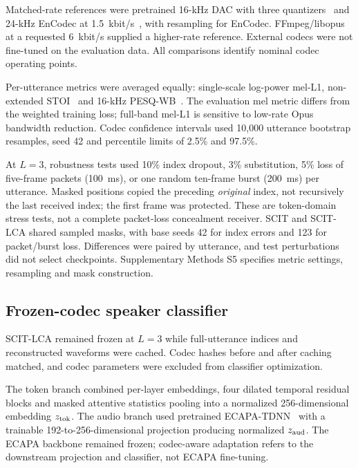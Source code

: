 \documentclass[final,5p,times,twocolumn]{elsarticle}
\begin{document}
Matched-rate references were pretrained 16-kHz DAC with three quantizers~\cite{dac} and 24-kHz EnCodec at 1.5~kbit/s~\cite{encodec}, with resampling for EnCodec. FFmpeg/libopus at a requested 6~kbit/s supplied a higher-rate reference. External codecs were not fine-tuned on the evaluation data. All comparisons identify nominal codec operating points.

Per-utterance metrics were averaged equally: single-scale log-power mel-L1, non-extended STOI~\cite{stoi} and 16-kHz PESQ-WB~\cite{pesq}. The evaluation mel metric differs from the weighted training loss; full-band mel-L1 is sensitive to low-rate Opus bandwidth reduction. Codec confidence intervals used 10,000 utterance bootstrap resamples, seed 42 and percentile limits of 2.5\% and 97.5\%.

At $L=3$, robustness tests used 10\% index dropout, 3\% substitution, 5\% loss of five-frame packets (100~ms), or one random ten-frame burst (200~ms) per utterance. Masked positions copied the preceding \emph{original} index, not recursively the last received index; the first frame was protected. These are token-domain stress tests, not a complete packet-loss concealment receiver. SCIT and SCIT-LCA shared sampled masks, with base seeds 42 for index errors and 123 for packet/burst loss. Differences were paired by utterance, and test perturbations did not select checkpoints. Supplementary Methods S5 specifies metric settings, resampling and mask construction.

\subsection{Frozen-codec speaker classifier}
SCIT-LCA remained frozen at $L=3$ while full-utterance indices and reconstructed waveforms were cached. Codec hashes before and after caching matched, and codec parameters were excluded from classifier optimization.

The token branch combined per-layer embeddings, four dilated temporal residual blocks and masked attentive statistics pooling into a normalized 256-dimensional embedding $z_{\rm tok}$. The audio branch used pretrained ECAPA-TDNN~\cite{ecapa} with a trainable 192-to-256-dimensional projection producing normalized $z_{\rm aud}$. The ECAPA backbone remained frozen; codec-aware adaptation refers to the downstream projection and classifier, not ECAPA fine-tuning.
\end{document}
